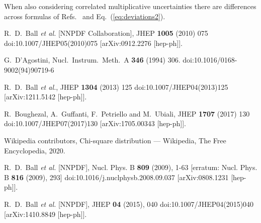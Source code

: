 \documentclass[10pt,a4paper]{article}
\begin{document}
When also considering correlated multiplicative uncertainties there
are differences across formulas of Refs.~\cite{Ball:2008by,
  Ball:2014uwa} and Eq.~(\ref{eq:deviations2}).


\begin{thebibliography}{alp}

  R.~D.~Ball {\it et al.} [NNPDF Collaboration],
  JHEP {\bf 1005} (2010) 075
  doi:10.1007/JHEP05(2010)075
  [arXiv:0912.2276 [hep-ph]].

  G.~D'Agostini,
  Nucl.\ Instrum.\ Meth.\ A {\bf 346} (1994) 306.
  doi:10.1016/0168-9002(94)90719-6

  R.~D.~Ball {\it et al.},
  JHEP {\bf 1304} (2013) 125
  doi:10.1007/JHEP04(2013)125
  [arXiv:1211.5142 [hep-ph]].

  R.~Boughezal, A.~Guffanti, F.~Petriello and M.~Ubiali,
  JHEP {\bf 1707} (2017) 130
  doi:10.1007/JHEP07(2017)130
  [arXiv:1705.00343 [hep-ph]].

    Wikipedia contributors,
    Chi-square distribution --- {Wikipedia}{,} The Free Encyclopedia,
    2020.

R.~D.~Ball \textit{et al.} [NNPDF],
Nucl. Phys. B \textbf{809} (2009), 1-63
[erratum: Nucl. Phys. B \textbf{816} (2009), 293]
doi:10.1016/j.nuclphysb.2008.09.037
[arXiv:0808.1231 [hep-ph]].

R.~D.~Ball \textit{et al.} [NNPDF],
JHEP \textbf{04} (2015), 040
doi:10.1007/JHEP04(2015)040
[arXiv:1410.8849 [hep-ph]].

\end{thebibliography}
\end{document}
